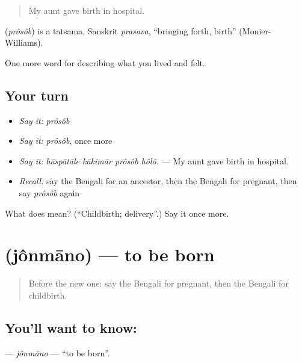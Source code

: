 \begin{quote}
My aunt gave birth in hospital.
\end{quote}

\begin{cousinweb}
\textbf{} (\emph{prôsôb}) is a tatsama, Sanskrit \emph{prasava}, \textquotedblleft{}bringing forth, birth\textquotedblright{} (Monier-Williams).
\end{cousinweb}

\begin{grammarlens}[title={What you've built}]
One more word for describing what you lived and felt.
\end{grammarlens}

\subsection*{Your turn}
\begin{itemize}
\raggedright
  \item \emph{Say it:} \emph{prôsôb}
  \item \emph{Say it:} \emph{prôsôb}, once more
  \item \emph{Say it:} \emph{hāspātāle kākimār prôsôb hôlô.} — My aunt gave birth in hospital.
  \item \emph{Recall:} say the Bengali for an ancestor, then the Bengali for pregnant, then say \emph{prôsôb} again
\end{itemize}

\begin{tcolorbox}[breakable,colback=teal!4,colframe=teal!35!black,title={Before you move on}]
What does  mean? (\textquotedblleft{}Childbirth; delivery\textquotedblright{}.) Say it once more.
\end{tcolorbox}
\section[\texorpdfstring{\bn{জন্মানো} (jônmāno)}{জন্মানো (jônmāno)}]{ (jônmāno) — to be born}

\label{lesson:BN-C485-jonmano}



\begin{quote}
Before the new one: say the Bengali for pregnant, then the Bengali for childbirth.
\end{quote}

\subsection*{You'll want to know: }
\textbf{} — \emph{jônmāno} — \textquotedblleft{}to be born\textquotedblright{}.

